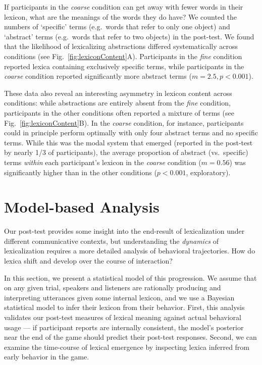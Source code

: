 If participants in the \emph{coarse} condition can get away with fewer words in their lexicon, what are the meanings of the words they do have? We counted the numbers of `specific' terms (e.g.\ words that refer to only one object) and `abstract' terms (e.g.\ words that refer to two objects) in the post-test. We found that the likelihood of lexicalizing abstractions differed systematically across conditions (see Fig.\ \ref{fig:lexiconContent}A). Participants in the \emph{fine} condition reported lexica containing exclusively specific terms, while participants in the \emph{coarse} condition reported significantly more abstract terms ($m = 2.5, p < 0.001$). 

These data also reveal an interesting asymmetry in lexicon content across conditions: while abstractions are entirely absent from the \emph{fine} condition, participants in the other conditions often reported a mixture of terms (see Fig.\ \ref{fig:lexiconContent}B). In the \emph{coarse} condition, for instance, participants could in principle perform optimally with only four abstract terms and no specific terms. While this was the modal system that emerged (reported in the post-test by nearly 1/3 of participants), the average proportion of abstract (vs.\ specific) terms \emph{within} each participant's lexicon in the \emph{coarse} condition ($m = 0.56$) was significantly higher than in the other conditions ($p < 0.001$, exploratory).

\section{Model-based Analysis}

Our post-test provides some insight into the end-result of lexicalization under different communicative contexts, but understanding the \emph{dynamics} of lexicalization requires a more detailed analysis of behavioral trajectories. How do lexica shift and develop over the course of interaction? 

In this section, we present a statistical model of this progression. We assume that on any given trial, speakers and listeners are rationally producing and interpreting utterances given some internal lexicon, and we use a Bayesian statistical model to infer their lexicon from their behavior. First, this analysis validates our post-test measures of lexical meaning against actual behavioral usage --- if participant reports are internally consistent, the model's posterior near the end of the game should predict their post-test responses. Second, we can examine the time-course of lexical emergence by inspecting lexica inferred from early behavior in the game. %


